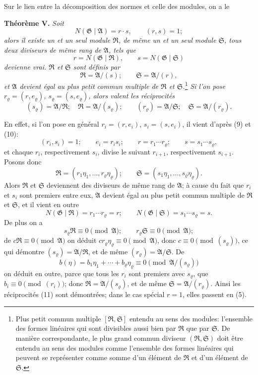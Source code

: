 \documentclass[11pt]{article}
\providecommand{\Amod}{\mathfrak A}
\providecommand{\Gmod}{\mathfrak G}
\providecommand{\Rmod}{\mathfrak R}
\providecommand{\Smod}{\mathfrak S}
\providecommand{\zero}[1]{\equiv 0\pmod{#1}}
\providecommand{\Norm}{N}
\begin{document}
Sur le lien entre la décomposition des normes et celle des modules, on a le

\medskip
\noindent\textbf{Théorème V.} \emph{Soit}
\begin{equation}
 \Norm(\Gmod\mid\Amod)=r\cdot s,\qquad (r,s)=1;
\tag{10}
\end{equation}
\emph{alors il existe un et un seul module $\Rmod$, de même un et un seul module $\Smod$, tous deux diviseurs de même rang de $\Amod$, tels que}
\[
 r=\Norm(\Gmod\mid\Rmod),\qquad s=\Norm(\Gmod\mid\Smod)
\]
\emph{devienne vrai. $\Rmod$ et $\Smod$ sont définis par}
\[
 \Rmod=\Amod/(s);\qquad \Smod=\Amod/(r),
\]
\emph{et $\Amod$ devient égal au plus petit commun multiple de $\Rmod$ et $\Smod$.}\footnote{Plus petit commun multiple $[\Rmod,\Smod]$ entendu au sens des modules: l'ensemble des formes linéaires qui sont divisibles aussi bien par $\Rmod$ que par $\Smod$. De manière correspondante, le plus grand commun diviseur $(\Rmod,\Smod)$ doit être entendu au sens des modules comme l'ensemble des formes linéaires qui peuvent se représenter comme somme d'un élément de $\Rmod$ et d'un élément de $\Smod$.}
\emph{Si l'on pose $r_\varrho=(r,e_\varrho)$, $s_\varrho=(s,e_\varrho)$, alors valent les réciprocités}
\begin{equation}
 (s_\varrho)=\Amod/\Rmod;\quad \Rmod=\Amod/(s_\varrho);
 \qquad
 (r_\varrho)=\Amod/\Smod;\quad \Smod=\Amod/(r_\varrho).
\tag{11}
\end{equation}

En effet, si l'on pose en général $r_i=(r,e_i)$, $s_i=(s,e_i)$, il vient d'après (9) et (10):
\[
 (r_i,s_i)=1;\qquad e_i=r_is_i;\qquad r=r_1\cdots r_\varrho;\qquad s=s_1\cdots s_\varrho,
\]
et chaque $r_i$, respectivement $s_i$, divise le suivant $r_{i+1}$, respectivement $s_{i+1}$. Posons donc
\[
 \Rmod=(r_1\eta_1,\ldots,r_\varrho\eta_\varrho);\qquad
 \Smod=(s_1\eta_1,\ldots,s_\varrho\eta_\varrho).
\]
Alors $\Rmod$ et $\Smod$ deviennent des diviseurs de même rang de $\Amod$; à cause du fait que $r_i$ et $s_i$ sont premiers entre eux, $\Amod$ devient égal au plus petit commun multiple de $\Rmod$ et $\Smod$, et il vient en outre
\[
 \Norm(\Gmod\mid\Rmod)=r_1\cdots r_\varrho=r;\qquad
 \Norm(\Gmod\mid\Smod)=s_1\cdots s_\varrho=s.
\]
De plus on a
\[
 s_\varrho\Rmod\zero{\Amod};\qquad r_\varrho\Smod\zero{\Amod};
\]
de $c\Rmod\zero{\Amod}$ on déduit $cr_\varrho\eta_\varrho\zero{\Amod}$, donc $c\zero{(s_\varrho)}$, ce qui démontre $(s_\varrho)=\Amod/\Rmod$, et de même $(r_\varrho)=\Amod/\Smod$. De
\[
 b(\eta)=b_1\eta_1+\cdots+b_\varrho\eta_\varrho\zero{\Amod/(s_\varrho)}
\]
on déduit en outre, parce que tous les $r_i$ sont premiers avec $s_\varrho$, que $b_i\zero{(r_i)}$; donc $\Rmod=\Amod/(s_\varrho)$, et de même $\Smod=\Amod/(r_\varrho)$. Ainsi les réciprocités (11) sont démontrées; dans le cas spécial $r=1$, elles passent en (5).
\end{document}
